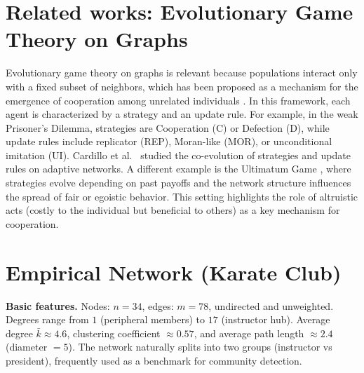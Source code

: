 \section{Related works: Evolutionary Game Theory on Graphs}
Evolutionary game theory on graphs is relevant because populations interact only
with a fixed subset of neighbors, which has been proposed as a mechanism for the
emergence of cooperation among unrelated individuals
\cite{cardillo2010coevolution}.  
In this framework, each agent is characterized by a strategy and an update rule.
For example, in the weak Prisoner’s Dilemma, strategies are Cooperation (C) or
Defection (D), while update rules include replicator (REP), Moran-like (MOR),
or unconditional imitation (UI).  
Cardillo et al.~\cite{cardillo2010coevolution} studied the co-evolution of
strategies and update rules on adaptive networks.  
A different example is the Ultimatum Game \cite{sinatra2009ultimatum}, where
strategies evolve depending on past payoffs and the network structure influences
the spread of fair or egoistic behavior.  
This setting highlights the role of altruistic acts (costly to the individual
but beneficial to others) as a key mechanism for cooperation.

\section{Empirical Network (Karate Club)}

\noindent\textbf{Basic features.}  
Nodes: $n=34$, edges: $m=78$, undirected and unweighted.  
Degrees range from $1$ (peripheral members) to $17$ (instructor hub).  
Average degree $\bar{k}\approx 4.6$, clustering coefficient $\approx 0.57$, and
average path length $\approx 2.4$ (diameter $=5$).  
The network naturally splits into two groups (instructor vs president),
frequently used as a benchmark for community detection.

